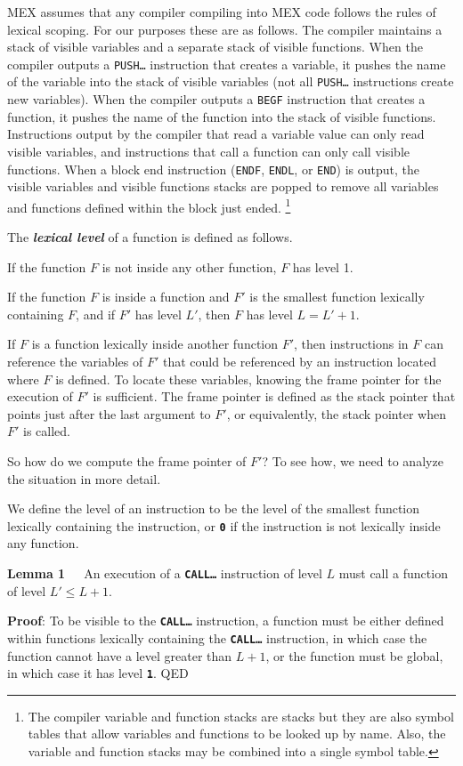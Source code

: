 \documentclass[12pt]{article}
\newcommand{\TT}[1]{{\tt \bfseries #1}}
\newcommand{\key}[1]{{\bf \em #1}\index{#1}}
\newenvironment{indpar}[1][0.3in]%
	{\begin{list}{}%
		     {\setlength{\itemsep}{0in}%
		      \setlength{\topsep}{0in}%
		      \setlength{\parsep}{1ex}%
		      \setlength{\labelwidth}{#1}%
		      \setlength{\leftmargin}{#1}%
		      \addtolength{\leftmargin}{\labelsep}}%
	 \item}%
	{\end{list}}
\begin{document}
MEX assumes that any compiler compiling into MEX code follows the
rules of lexical scoping.  For our purposes these are as follows.
The compiler maintains a stack of visible variables and a separate
stack of visible functions.  When the compiler outputs a {\tt PUSH\ldots}
instruction that creates a variable, it pushes the name of the variable
into the stack of visible variables (not all {\tt PUSH\ldots} instructions
create new variables).  When the compiler outputs a {\tt BEGF}
instruction that creates a function, it pushes the name of the function
into the stack of visible functions.  Instructions output by the compiler
that read a variable value can only read visible variables, and 
instructions that call a function can only call visible functions.
When a block end instruction ({\tt ENDF}, {\tt ENDL}, or {\tt END}) is
output, the visible variables and visible functions stacks are popped to
remove all variables and functions defined within the block just ended.%
\footnote{The compiler variable and function stacks are stacks but they
are also symbol tables that allow variables and functions to be looked
up by name.  Also, the variable and function stacks may be combined into
a single symbol table.}

The \key{lexical level}\label{LEXICAL-LEVEL}
of a function is defined as follows.

If the function $F$ is not inside any other function, $F$ has
level 1.

If the function $F$ is inside a function and $F'$ is the smallest
function lexically containing $F$, and if $F'$ has level $L'$, then $F$
has level $L=L'+1$.

If $F$ is a function lexically inside another function $F'$, then instructions
in $F$ can reference the variables of $F'$ that could be referenced by
an instruction located where $F$ is defined.
To locate these variables, knowing the frame pointer for the
execution of $F'$ is sufficient.  The frame pointer is defined as the
stack pointer that points just after the last argument to $F'$,
or equivalently, the stack
pointer when $F'$ is called.

So how do we compute the frame pointer of $F'$?  To see how,
we need to analyze the situation in more detail.

We define the level of an instruction to be the level of the
smallest function lexically containing the instruction, or \TT{0} if the
instruction is not lexically inside any function.

\begin{indpar}
{\bf Lemma 1}\label{LEMMA-1}~~~An execution of a \TT{CALL\ldots} instruction of
level $L$ must call a function of level $L'\leq L+1$.
\end{indpar}
\begin{indpar}
{\bf Proof}: To be visible to the \TT{CALL\ldots}
instruction, a function must be either defined within functions
lexically containing the \TT{CALL\ldots} instruction, in which case the
function cannot have a level greater than $L+1$, or the function must be global,
in which case it has level \TT{1}.  QED
\end{indpar}
\end{document}
